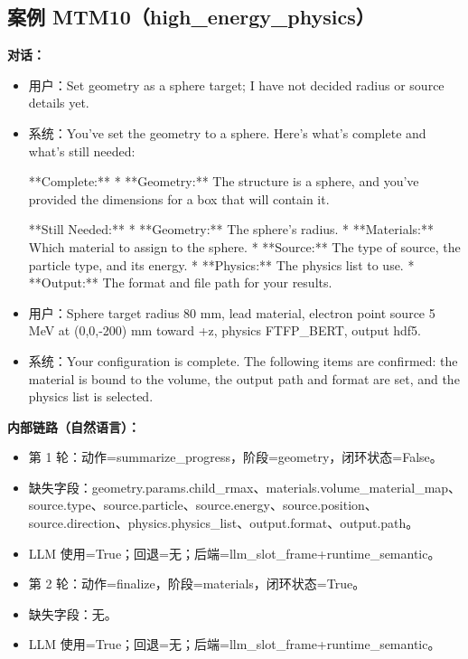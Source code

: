 \documentclass[11pt]{ctexart}
\begin{document}
\subsection{案例 MTM10（high\_energy\_physics）}
\textbf{对话：}
\begin{itemize}
\item 用户：Set geometry as a sphere target; I have not decided radius or source details yet.
\item 系统：You've set the geometry to a sphere. Here's what's complete and what's still needed:

**Complete:**
*   **Geometry:** The structure is a sphere, and you've provided the dimensions for a box that will contain it.

**Still Needed:**
*   **Geometry:** The sphere's radius.
*   **Materials:** Which material to assign to the sphere.
*   **Source:** The type of source, the particle type, and its energy.
*   **Physics:** The physics list to use.
*   **Output:** The format and file path for your results.
\item 用户：Sphere target radius 80 mm, lead material, electron point source 5 MeV at (0,0,-200) mm toward +z, physics FTFP\_BERT, output hdf5.
\item 系统：Your configuration is complete. The following items are confirmed: the material is bound to the volume, the output path and format are set, and the physics list is selected.
\end{itemize}
\textbf{内部链路（自然语言）：}
\begin{itemize}
\item 第 1 轮：动作=summarize\_progress，阶段=geometry，闭环状态=False。
\item 缺失字段：geometry.params.child\_rmax、materials.volume\_material\_map、source.type、source.particle、source.energy、source.position、source.direction、physics.physics\_list、output.format、output.path。
\item LLM 使用=True；回退=无；后端=llm\_slot\_frame+runtime\_semantic。
\item 第 2 轮：动作=finalize，阶段=materials，闭环状态=True。
\item 缺失字段：无。
\item LLM 使用=True；回退=无；后端=llm\_slot\_frame+runtime\_semantic。
\end{itemize}
\end{document}
